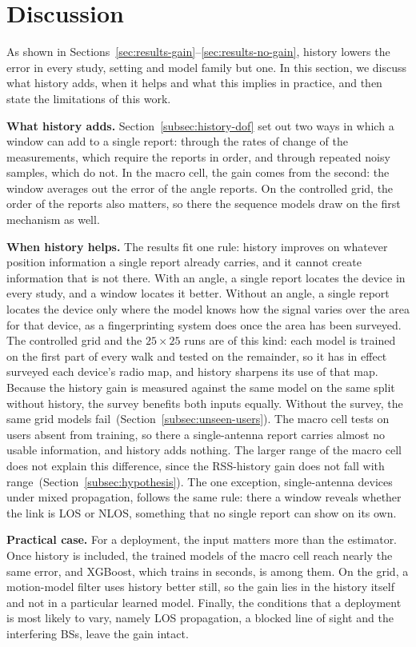 \section{Discussion}
\label{sec:discussion}

As shown in Sections~\ref{sec:results-gain}--\ref{sec:results-no-gain}, history lowers the error in every study, setting and model family but one. In this section, we discuss what history adds, when it helps and what this implies in practice, and then state the limitations of this work.

\noindent\textbf{What history adds.}
Section~\ref{subsec:history-dof} set out two ways in which a window can add to a single report: through the rates of change of the measurements, which require the reports in order, and through repeated noisy samples, which do not. In the macro cell, the gain comes from the second: the window averages out the error of the angle reports. On the controlled grid, the order of the reports also matters, so there the sequence models draw on the first mechanism as well.

\noindent\textbf{When history helps.}
The results fit one rule: history improves on whatever position information a single report already carries, and it cannot create information that is not there. With an angle, a single report locates the device in every study, and a window locates it better. Without an angle, a single report locates the device only where the model knows how the signal varies over the area for that device, as a fingerprinting system does once the area has been surveyed. The controlled grid and the $25\times25$ runs are of this kind: each model is trained on the first part of every walk and tested on the remainder, so it has in effect surveyed each device's radio map, and history sharpens its use of that map. Because the history gain is measured against the same model on the same split without history, the survey benefits both inputs equally. Without the survey, the same grid models fail~(Section~\ref{subsec:unseen-users}). The macro cell tests on users absent from training, so there a single-antenna report carries almost no usable information, and history adds nothing. The larger range of the macro cell does not explain this difference, since the RSS-history gain does not fall with range~(Section~\ref{subsec:hypothesis}). The one exception, single-antenna devices under mixed propagation, follows the same rule: there a window reveals whether the link is LOS or NLOS, something that no single report can show on its own.

\noindent\textbf{Practical case.}
For a deployment, the input matters more than the estimator. Once history is included, the trained models of the macro cell reach nearly the same error, and XGBoost, which trains in seconds, is among them. On the grid, a motion-model filter uses history better still, so the gain lies in the history itself and not in a particular learned model. Finally, the conditions that a deployment is most likely to vary, namely LOS propagation, a blocked line of sight and the interfering BSs, leave the gain intact.
